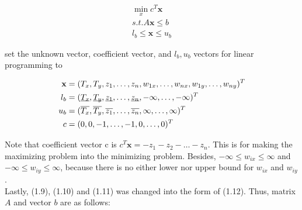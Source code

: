 \documentclass[paper=a4, fontsize=11pt]{scrartcl} %
\numberwithin{equation}{section} %
\numberwithin{figure}{section} %
\numberwithin{table}{section} %
\renewcommand{\vec}[1]{\mathbf{#1}}
\begin{document}
\begin{equation}
\begin{split}
\min_{x} c^{T}\vec{x} \\
s.t. A\vec{x} \leq b \\
l_{b} \leq \vec{x} \leq u_{b} 
\end{split}
\end{equation}

set the unknown vector, coefficient vector, and $l_{b}, u_{b}$ vectors for linear programming to

\begin{equation}
\begin{split}
\vec{x} &= (T_{x}, T_{y}, z_{1}, \dots, z_{n}, w_{1x}, \dots, w_{nx}, w_{1y}, \dots, w_{ny})^{T} \\
l_{b} &= (\underbar{$T_{x}$}, \underbar{$T_{y}$}, \underbar{$z_{1}$}, \dots, \underbar{$z_{n}$}, -\infty, \dots, -\infty)^{T} \\
u_{b} &= (\overline{T_{x}}, \overline{T_{y}}, \overline{z_{1}}, \dots, \overline{z_{n}}, \infty, \dots, \infty)^{T} \\
c &= (0, 0, -1, \dots, -1, 0, \dots, 0)^{T}
\end{split}
\end{equation}

Note that coefficient vector c is $c^{T} \vec{x} = - z_{1} - z_{2} - \dots - z_{n}$. This is for making the maximizing problem into the minimizing problem. Besides, $-\infty \leq w_{ix} \leq \infty$ and $-\infty \leq w_{iy} \leq \infty$, because there is no either lower nor upper bound for $w_{ix}$ and $w_{iy}$. \\

Lastly, (1.9), (1.10) and (1.11) was changed into the form of (1.12). Thus, matrix $A$ and vector $b$ are as follows:
\end{document}
